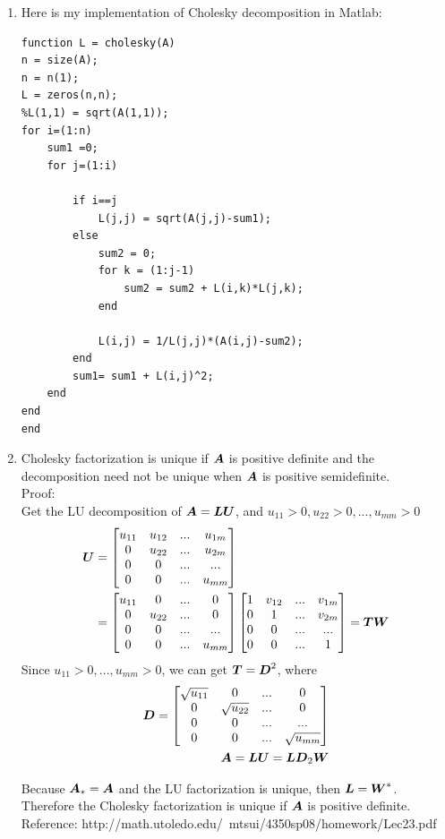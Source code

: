 \documentclass{article}
\begin{document}
\begin{enumerate} 
\item 
Here is my implementation of Cholesky decomposition in Matlab: 
\begin{lstlisting}
function L = cholesky(A)
n = size(A); 
n = n(1); 
L = zeros(n,n);
%L(1,1) = sqrt(A(1,1)); 
for i=(1:n)
    sum1 =0;     
    for j=(1:i) 

        if i==j
            L(j,j) = sqrt(A(j,j)-sum1); 
        else 
            sum2 = 0; 
            for k = (1:j-1) 
                sum2 = sum2 + L(i,k)*L(j,k); 
            end 
            
            L(i,j) = 1/L(j,j)*(A(i,j)-sum2); 
        end 
        sum1= sum1 + L(i,j)^2;   
    end 
end 
end 
\end{lstlisting} 
\item 
Cholesky factorization is unique if $\boldsymbol{A}$ is positive definite and the decomposition need not be unique when $\boldsymbol{A}$ is positive semidefinite.  \\
Proof: \\
Get the LU decomposition of $\boldsymbol{A}=\boldsymbol{L}\boldsymbol{U}$,  and $u_{11}>0, u_{22}>0, ..., u_{mm}>0 $ 
\begin{align*} 
\boldsymbol{U} &=\begin{bmatrix} u_{11} & u_{12} & ... & u_{1m} \\ 0 & u_{22} & ... & u_{2m} \\ 0 & 0 & ... & ... \\ 0 & 0 & ... & u_{mm}  \end{bmatrix}\\
& = \begin{bmatrix} u_{11} & 0 & ... & 0 \\ 0 & u_{22} & ... & 0 \\ 0 & 0 & ... & ... \\ 0 & 0 & ... & u_{mm} \end{bmatrix} \begin{bmatrix} 1 & v_{12} & ... & v_{1m} \\ 0 & 1 & ... & v_{2m} \\ 0 & 0 & ... & ... \\ 0 & 0 & ... & 1 \end{bmatrix}=\boldsymbol{T}\boldsymbol{W}
\end{align*} 
Since $u_{11} >0, ..., u_{mm}>0 $,  we can get $\boldsymbol{T}=\boldsymbol{D}^2$, where \begin{align*} \boldsymbol{D} = \begin{bmatrix} \sqrt{u_{11}} & 0 & ... & 0 \\ 0 & \sqrt{u_{22}} & ... & 0 \\ 0 & 0 & ... & ... \\ 0 & 0 & ... & \sqrt{u_{mm}} \end{bmatrix} \\
\boldsymbol{A} = \boldsymbol{L}\boldsymbol{U} = \boldsymbol{L}\boldsymbol{D}_2\boldsymbol{W} \end{align*}

Because $\boldsymbol{A}_*=\boldsymbol{A}$ and the LU factorization is unique, then $\boldsymbol{L}=\boldsymbol{W}^*$. Therefore the Cholesky factorization is unique if $\boldsymbol{A}$ is positive definite.  \\
Reference: http://math.utoledo.edu/~mtsui/4350sp08/homework/Lec23.pdf \\



\end{enumerate}
\end{document}
